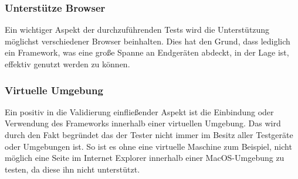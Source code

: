 	\subsubsection{Unterstütze Browser}
	Ein wichtiger Aspekt der durchzuführenden Tests wird die Unterstützung möglichst verschiedener Browser beinhalten. Dies hat 	den Grund, dass lediglich ein Framework, was eine große Spanne an Endgeräten abdeckt, in der Lage ist, effektiv genutzt werden 	zu können.

	\subsubsection{Virtuelle Umgebung}
	Ein positiv in die Validierung einfließender Aspekt ist die Einbindung oder Verwendung des Frameworks innerhalb einer 			virtuellen Umgebung. Das wird durch den Fakt begründet das der Tester nicht immer im Besitz aller Testgeräte oder 				Umgebungen ist. So ist es ohne eine virtuelle Maschine zum Beispiel, nicht möglich eine Seite im Internet Explorer innerhalb 		einer MacOS-Umgebung zu testen, da diese ihn nicht unterstützt.

